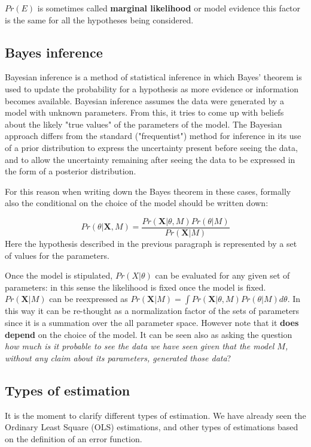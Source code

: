 \documentclass[12pt, letterpaper]{article}
\theoremstyle{definition}
\newcommand{\X}{\mathrm{\mathbf{X}}}
\begin{document}
$Pr(E)$ is sometimes called \textbf{marginal likelihood} or model evidence this factor is the same for all the hypotheses being considered.

\subsection{Bayes inference}
Bayesian inference is a method of statistical inference in which Bayes' theorem is used to update the probability for a hypothesis as more evidence or information becomes available. Bayesian inference assumes the data were generated by a model with unknown parameters. From this, it tries to come up with beliefs about the likely  "true values" of the parameters of the model. The Bayesian approach differs from the standard ("frequentist") method for inference in its use of a prior distribution to express the uncertainty present before seeing the data, and to allow the uncertainty remaining after seeing the data to be expressed in the form of a posterior distribution.

For this reason when writing down the Bayes theorem in these cases, formally also the conditional on the choice of the model should be written down:

\begin{equation}
Pr(\theta|\X,M) = \frac{Pr(\X|\theta,M)Pr(\theta|M)}{Pr(\X|M)}
\end{equation}
Here the hypothesis described in the previous paragraph is represented by a set of values for the parameters.

Once the model is stipulated, $Pr(X|\theta)$ can be evaluated for any given set of parameters: in this sense the likelihood is fixed once the model is fixed.
$Pr(\X|M)$ can be reexpressed as $Pr(\X|M) =\int Pr(\X|\theta,M)Pr(\theta|M)d\theta$. In this way it can be re-thought as a normalization factor of the sets of parameters since it is a summation over the all parameter space. However note that it \textbf{does depend} on the choice of the model. It can be seen also as asking the question \textit{how much is it probable to see the data we have seen given that the model $M$, without any claim about its parameters, generated those data}?

\subsection{Types of estimation}
\label{ssec:estimations}
It is the moment to clarify different types of estimation. We have already seen the Ordinary Least Square (OLS) estimations, and other types of estimations based on the definition of an error function.
\end{document}
